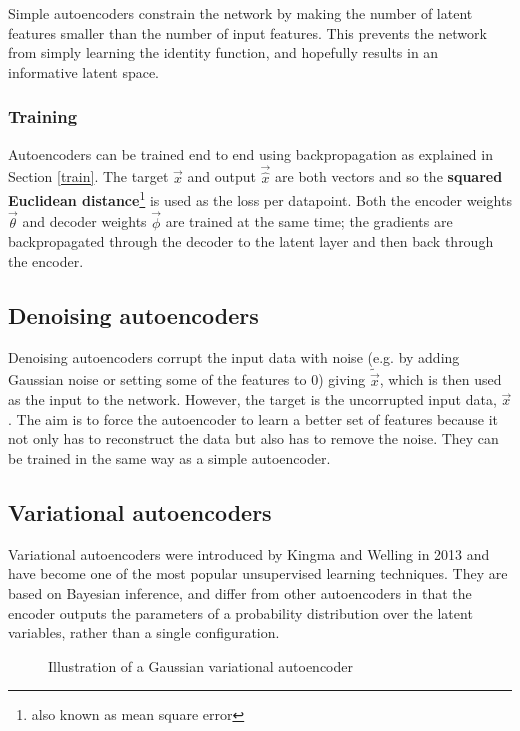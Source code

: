 Simple autoencoders constrain the network by making the number of latent features smaller than the number of input
features. This prevents the network from simply learning the identity function, and hopefully results in an informative latent space.

\subsubsection{Training}
Autoencoders can be trained end to end using backpropagation as explained in Section \ref{train}. The target $\vec{x}$ and output 
$\vec{\hat{x}}$ are both vectors and so 
the \textbf{squared Euclidean distance}\footnote{also known as mean square error} is used as the loss per datapoint. Both the encoder weights 
$\vec{\theta}$ and 
decoder weights $\vec{\phi}$ 
are trained at the 
same time; the gradients are backpropagated through the decoder to the latent layer and then back through the encoder. 

\subsection{Denoising autoencoders}

Denoising autoencoders corrupt the input data with noise (e.g. by adding Gaussian noise or setting some of
the features to 0) giving $\tilde{\vec{x}}$, which is then used as the input to the network. However, the target is the uncorrupted input data, 
$\vec{x}$. The aim is to force the autoencoder to learn a better set of features because it not only has to reconstruct the data but also 
has to remove the noise. They can be trained in the same way as a simple autoencoder.

\subsection{Variational autoencoders} \label{vae}

Variational autoencoders were 
introduced by Kingma and Welling in 2013 and have become one of the most popular unsupervised learning techniques. 
They are based on Bayesian inference, and differ from other autoencoders in that the encoder outputs
the parameters of a probability distribution over the latent variables, rather than a single configuration.
\begin{figure}[H]
  \begin{center}
      \scalebox{.7}{}
      \caption{Illustration of a Gaussian variational autoencoder}
      \label{fig:gauss_vae}
  \end{center}
\end{figure}

